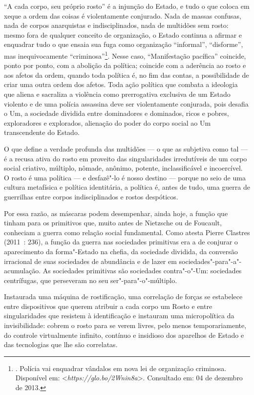 ``A cada corpo, seu próprio rosto'' é a injunção do Estado, e tudo o que
coloca em xeque a ordem das coisas é violentamente conjurado. Nada de
massas confusas, nada de corpos anarquistas e indisciplinados, nada de
multidões sem rosto: mesmo fora de qualquer conceito de
organização, o Estado continua a afirmar e enquadrar tudo
o que ensaia sua fuga como organização ``informal'', ``disforme'', mas
inequivocamente ``criminosa''\footnote{. Polícia vai
  enquadrar vândalos em nova lei de organização criminosa. Disponível
  em:
  \textless{}\emph{https://glo.bo/2Wnin8a}\textgreater{}.
  Consultado em: 04 de dezembro de 2013.}. Nesse caso, ``Manifestação pacífica''
coincide, ponto por ponto, com a abolição da política; coincide com a
aderência ao rosto e aos afetos da ordem, quando toda política é, no fim
das contas, a possibilidade de criar uma outra ordem dos afetos. Toda
ação política que combata a ideologia que aliena e sacraliza a violência
como prerrogativa exclusiva de um Estado violento e de uma polícia
assassina deve ser violentamente conjurada, pois desafia o Um, a
sociedade dividida entre dominadores e dominados, ricos e pobres,
exploradores e explorados, alienação do poder do corpo social ao Um
transcendente do Estado.

O que define a verdade profunda das multidões --- o que as subjetiva como
tal --- é a recusa ativa do rosto em proveito das singularidades
irredutíveis de um corpo social criativo, múltiplo, nômade, anônimo,
potente, inclassificável e incoercível. O rosto é uma política --- e
desfazê"-lo é nosso destino --- porque no seio de uma cultura metafísica e
política identitária, a política é, antes de tudo, uma guerra de
guerrilhas entre corpos indisciplinados e rostos despóticos.

Por essa razão, as máscaras podem desempenhar, ainda hoje, a função que
tinham para os primitivos que, muito antes de Nietzsche ou de Foucault,
conheciam a guerra como relação social fundamental. Como atesta Pierre
Clastres (2011~: 236), a função da guerra nas sociedades primitivas era
a de conjurar o aparecimento da forma"-Estado na chefia, da sociedade
dividida, da conversão irracional de suas sociedades de abundância e de
lazer em sociedades"-para"-a"-acumulação. As sociedades primitivas são
sociedades contra"-o"-Um: sociedades centrífugas, que perseveram no seu
ser"-para"-o"-múltiplo.

Instaurada uma máquina de rostificação, uma correlação de forças se
estabelece entre dispositivos que querem atribuir a cada corpo um Rosto
e entre singularidades que resistem à identificação e instauram uma
micropolítica da invisibilidade: cobrem o rosto para se verem livres,
pelo menos temporariamente, do controle virtualmente infinito, contínuo
e insidioso dos aparelhos de Estado e das tecnologias que lhe são
correlatas.

